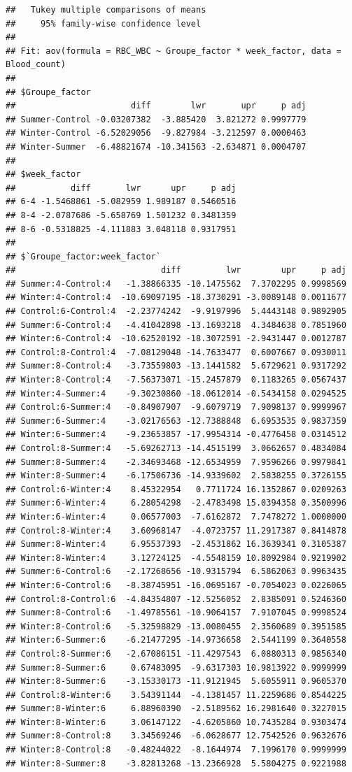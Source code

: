 \documentclass[
]{article}
\begin{document}
\begin{verbatim}
##   Tukey multiple comparisons of means
##     95% family-wise confidence level
## 
## Fit: aov(formula = RBC_WBC ~ Groupe_factor * week_factor, data = Blood_count)
## 
## $Groupe_factor
##                       diff        lwr       upr     p adj
## Summer-Control -0.03207382  -3.885420  3.821272 0.9997779
## Winter-Control -6.52029056  -9.827984 -3.212597 0.0000463
## Winter-Summer  -6.48821674 -10.341563 -2.634871 0.0004707
## 
## $week_factor
##           diff       lwr      upr     p adj
## 6-4 -1.5468861 -5.082959 1.989187 0.5460516
## 8-4 -2.0787686 -5.658769 1.501232 0.3481359
## 8-6 -0.5318825 -4.111883 3.048118 0.9317951
## 
## $`Groupe_factor:week_factor`
##                             diff         lwr        upr     p adj
## Summer:4-Control:4   -1.38866335 -10.1475562  7.3702295 0.9998569
## Winter:4-Control:4  -10.69097195 -18.3730291 -3.0089148 0.0011677
## Control:6-Control:4  -2.23774242  -9.9197996  5.4443148 0.9892905
## Summer:6-Control:4   -4.41042898 -13.1693218  4.3484638 0.7851960
## Winter:6-Control:4  -10.62520192 -18.3072591 -2.9431447 0.0012787
## Control:8-Control:4  -7.08129048 -14.7633477  0.6007667 0.0930011
## Summer:8-Control:4   -3.73559803 -13.1441582  5.6729621 0.9317292
## Winter:8-Control:4   -7.56373071 -15.2457879  0.1183265 0.0567437
## Winter:4-Summer:4    -9.30230860 -18.0612014 -0.5434158 0.0294525
## Control:6-Summer:4   -0.84907907  -9.6079719  7.9098137 0.9999967
## Summer:6-Summer:4    -3.02176563 -12.7388848  6.6953535 0.9837359
## Winter:6-Summer:4    -9.23653857 -17.9954314 -0.4776458 0.0314512
## Control:8-Summer:4   -5.69262713 -14.4515199  3.0662657 0.4834084
## Summer:8-Summer:4    -2.34693468 -12.6534959  7.9596266 0.9979841
## Winter:8-Summer:4    -6.17506736 -14.9339602  2.5838255 0.3726155
## Control:6-Winter:4    8.45322954   0.7711724 16.1352867 0.0209263
## Summer:6-Winter:4     6.28054298  -2.4783498 15.0394358 0.3500996
## Winter:6-Winter:4     0.06577003  -7.6162872  7.7478272 1.0000000
## Control:8-Winter:4    3.60968147  -4.0723757 11.2917387 0.8414878
## Summer:8-Winter:4     6.95537393  -2.4531862 16.3639341 0.3105387
## Winter:8-Winter:4     3.12724125  -4.5548159 10.8092984 0.9219902
## Summer:6-Control:6   -2.17268656 -10.9315794  6.5862063 0.9963435
## Winter:6-Control:6   -8.38745951 -16.0695167 -0.7054023 0.0226065
## Control:8-Control:6  -4.84354807 -12.5256052  2.8385091 0.5246360
## Summer:8-Control:6   -1.49785561 -10.9064157  7.9107045 0.9998524
## Winter:8-Control:6   -5.32598829 -13.0080455  2.3560689 0.3951585
## Winter:6-Summer:6    -6.21477295 -14.9736658  2.5441199 0.3640558
## Control:8-Summer:6   -2.67086151 -11.4297543  6.0880313 0.9856340
## Summer:8-Summer:6     0.67483095  -9.6317303 10.9813922 0.9999999
## Winter:8-Summer:6    -3.15330173 -11.9121945  5.6055911 0.9605370
## Control:8-Winter:6    3.54391144  -4.1381457 11.2259686 0.8544225
## Summer:8-Winter:6     6.88960390  -2.5189562 16.2981640 0.3227015
## Winter:8-Winter:6     3.06147122  -4.6205860 10.7435284 0.9303474
## Summer:8-Control:8    3.34569246  -6.0628677 12.7542526 0.9632676
## Winter:8-Control:8   -0.48244022  -8.1644974  7.1996170 0.9999999
## Winter:8-Summer:8    -3.82813268 -13.2366928  5.5804275 0.9221988
\end{verbatim}
\end{document}
